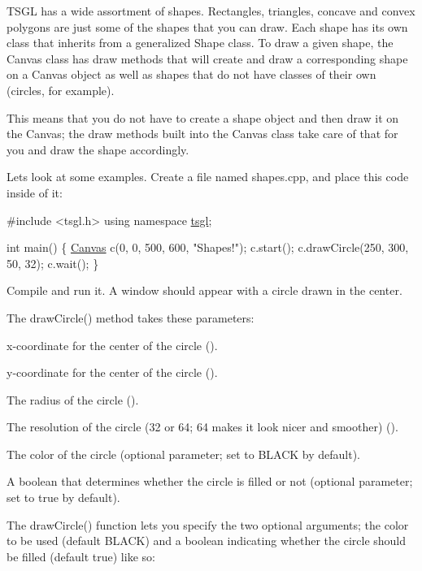 T\+S\+G\+L has a wide assortment of shapes. Rectangles, triangles, concave and convex polygons are just some of the shapes that you can draw. Each shape has its own class that inherits from a generalized Shape class. To draw a given shape, the Canvas class has draw methods that will create and draw a corresponding shape on a Canvas object as well as shapes that do not have classes of their own (circles, for example).

This means that you do not have to create a shape object and then draw it on the Canvas; the draw methods built into the Canvas class take care of that for you and draw the shape accordingly.

Let\textquotesingle{}s look at some examples. Create a file named shapes.\+cpp, and place this code inside of it\+:


\begin{DoxyCode}
\textcolor{preprocessor}{#include <tsgl.h>}
\textcolor{keyword}{using namespace }\hyperlink{namespacetsgl}{tsgl};

\textcolor{keywordtype}{int} main() \{
  \hyperlink{classtsgl_1_1_canvas}{Canvas} c(0, 0, 500, 600, \textcolor{stringliteral}{"Shapes!"});
  c.start();
  c.drawCircle(250, 300, 50, 32);
  c.wait();
\}
\end{DoxyCode}


Compile and run it. A window should appear with a circle drawn in the center.

The draw\+Circle() method takes these parameters\+:


\begin{DoxyItemize}
\item x-\/coordinate for the center of the circle ({}).
\item y-\/coordinate for the center of the circle ({}).
\item The radius of the circle ({}).
\item The resolution of the circle (32 or 64; 64 makes it look nicer and smoother) ({}).
\item The color of the circle (optional parameter; set to {\ttfamily B\+L\+A\+C\+K} by default).
\item A boolean that determines whether the circle is filled or not (optional parameter; set to {\ttfamily true} by default).
\end{DoxyItemize}

The draw\+Circle() function lets you specify the two optional arguments; the color to be used (default {\ttfamily B\+L\+A\+C\+K}) and a boolean indicating whether the circle should be filled (default {\ttfamily true}) like so\+:


